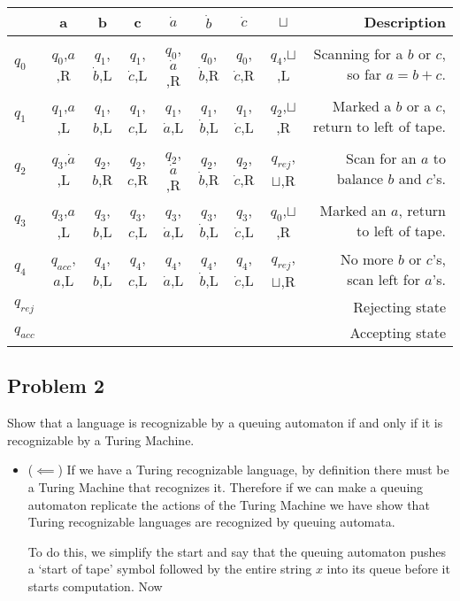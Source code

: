 \documentclass[english]{article}
\begin{document}
\begin{center}
	\begin{tabular}{ l | c | c | c | c | c | c | c | r }
		& a & b & c & $\dot{a}$ & $\dot{b}$ & $\dot{c}$ & $\sqcup$ & Description\\
		\hline
		$q_0$ & $q_0$,$a$,R & $q_1$,$\dot{b}$,L & $q_1$,$\dot{c}$,L & $q_0$,$\dot{a}$,R & $q_0$,$\dot{b}$,R & $q_0$,$\dot{c}$,R & $q_4$,$\sqcup$,L & Scanning for a $b$ or $c$, so far $a=b+c$. \\ \hline
		$q_1$ & $q_1$,$a$,L & $q_1$,$b$,L & $q_1$,$c$,L & $q_1$,$\dot{a}$,L & $q_1$,$\dot{b}$,L & $q_1$,$\dot{c}$,L & $q_2$,$\sqcup$,R & Marked a $b$ or a $c$, return to left of tape.\\ \hline
		$q_2$ & $q_3$,$\dot{a}$,L & $q_2$,$b$,R & $q_2$,$c$,R & $q_2$,$\dot{a}$,R & $q_2$,$\dot{b}$,R & $q_2$,$\dot{c}$,R & $q_{rej}$,$\sqcup$,R & Scan for an $a$ to balance $b$ and $c$'s.\\ \hline
		$q_3$ & $q_3$,$a$,L & $q_3$,$b$,L & $q_3$,$c$,L & $q_3$,$\dot{a}$,L & $q_3$,$\dot{b}$,L & $q_3$,$\dot{c}$,L & $q_0$,$\sqcup$,R & Marked an $a$, return to left of tape.\\ \hline
		$q_4$ & $q_{acc}$,$a$,L & $q_4$,$b$,L & $q_4$,$c$,L & $q_4$,$\dot{a}$,L & $q_4$,$\dot{b}$,L & $q_4$,$\dot{c}$,L & $q_{rej}$,$\sqcup$,R & No more $b$ or $c$'s, scan left for $a$'s.\\ \hline
		$q_{rej}$ &&&&&&&& Rejecting state \\ \hline
		$q_{acc}$ &&&&&&&& Accepting state \\
		\hline
	\end{tabular}
\end{center}

\subsection*{Problem 2}
Show that a language is recognizable by a queuing automaton if and only if it
is recognizable by a Turing Machine.
\begin{itemize}
\item ($ \impliedby $) If we have a Turing recognizable language, by
  definition there must be a Turing Machine that recognizes it. Therefore if
  we can make a queuing automaton replicate the actions of the Turing Machine
  we have show that Turing recognizable languages are recognized by queuing
  automata.

  To do this, we simplify the start and say that the queuing automaton pushes
  a `start of tape' symbol followed by the entire string $x$ into its queue before
  it starts computation. Now
\end{itemize}
\end{document}
